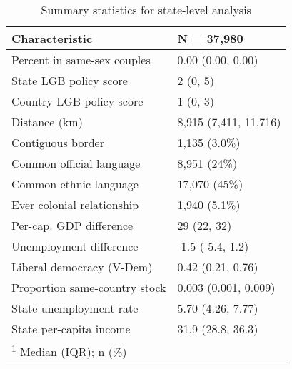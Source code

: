 \documentclass[
  11pt,
]{article}
\begin{document}
\begin{table}[!h]

\caption{\label{tab:desc-table-state}Summary statistics for state-level analysis}
\centering
\fontsize{8}{10}\selectfont
\begin{tabular}[t]{ll}
\toprule
Characteristic & N = 37,980\\
\midrule
Percent in same-sex couples & 0.00 (0.00, 0.00)\\
State LGB policy score & 2 (0, 5)\\
Country LGB policy score & 1 (0, 3)\\
Distance (km) & 8,915 (7,411, 11,716)\\
Contiguous border & 1,135 (3.0\%)\\
\addlinespace
Common official language & 8,951 (24\%)\\
Common ethnic language & 17,070 (45\%)\\
Ever colonial relationship & 1,940 (5.1\%)\\
Per-cap. GDP difference & 29 (22, 32)\\
Unemployment difference & -1.5 (-5.4, 1.2)\\
\addlinespace
Liberal democracy (V-Dem) & 0.42 (0.21, 0.76)\\
Proportion same-country stock & 0.003 (0.001, 0.009)\\
State unemployment rate & 5.70 (4.26, 7.77)\\
State per-capita income & 31.9 (28.8, 36.3)\\
\bottomrule
\multicolumn{2}{l}{\rule{0pt}{1em}\textsuperscript{1} Median (IQR); n (\%)}\\
\end{tabular}
\end{table}
\end{document}

